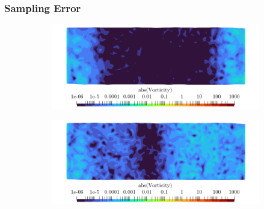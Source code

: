 \subsubsection{Sampling Error}


\begin{figure}[t]
\centering
    \begin{subfigure}{0.49\textwidth}
    \centering
    \includegraphics[scale=0.325]{assets/graphs/double-instab.0003.png}
    \caption{}
    \label{fig:qwave1}
    \end{subfigure}
    \begin{subfigure}{0.49\textwidth}
    \centering
    \includegraphics[scale=0.325]{assets/graphs/double-instab.0004.png}
    \caption{}
    \label{fig:qwave2}
    \end{subfigure}

\vspace*{0.5em}


\end{figure}
